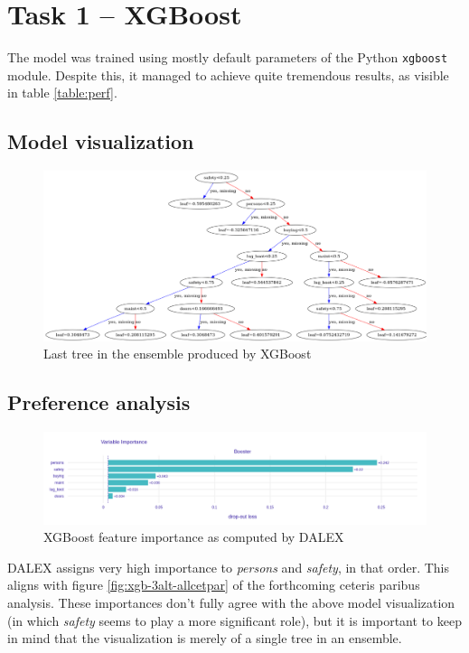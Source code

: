 \documentclass[../main.tex]{subfiles}
\begin{document}
\section{Task 1 -- XGBoost}
The model was trained using mostly default parameters of the Python
\verb`xgboost` module. Despite this, it managed to achieve quite tremendous
results, as visible in table \ref{table:perf}.

\subsection{Model visualization}
\begin{figure}[H]
	\centering
	\includegraphics[width=\linewidth]{../img/xgb-tree.png}
	\caption{Last tree in the ensemble produced by XGBoost}
	\label{fig:xgb-tree}
\end{figure}

\subsection{Preference analysis}
\begin{figure}[H]
	\centering
	\includegraphics[width=\linewidth]{../img/xgb-feature-importance.png}
	\caption{XGBoost feature importance as computed by DALEX}
	\label{fig:xgb-feats}
\end{figure}
DALEX assigns very high importance to \emph{persons} and \emph{safety}, in that
order. This aligns with figure \ref{fig:xgb-3alt-allcetpar} of the forthcoming
ceteris paribus analysis. These importances don't fully agree with the above
model visualization (in which \emph{safety} seems to play a more significant
role), but it is important to keep in mind that the visualization is merely of
a single tree in an ensemble.
\end{document}
